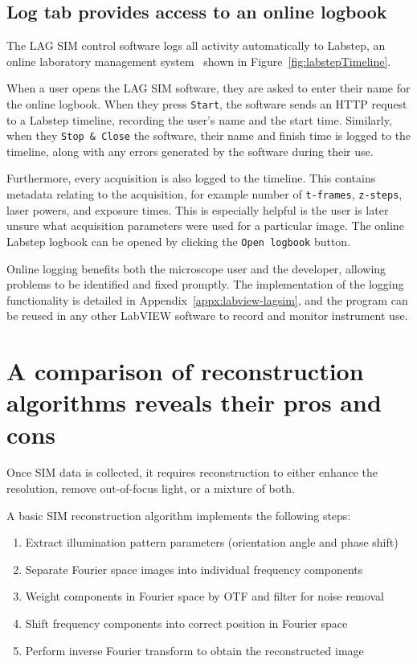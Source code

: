 \subsection{Log tab provides access to an online logbook}
The LAG SIM control software logs all activity automatically to Labstep, an online laboratory management system~\cite{labstep} shown in Figure~\ref{fig:labstepTimeline}.

When a user opens the LAG SIM software, they are asked to enter their name for the online logbook.
When they press \texttt{Start}, the software sends an HTTP request to a Labstep timeline,  recording the user's name and the start time.
Similarly, when they \texttt{Stop \& Close} the software, their name and finish time is logged to the timeline, along with any errors generated by the software during their use.

Furthermore, every acquisition is also logged to the timeline.
This contains metadata relating to the acquisition, for example number of \texttt{t-frames}, \texttt{z-steps}, laser powers, and exposure times.
This is especially helpful is the user is later unsure what acquisition parameters were used for a particular image.
The online Labstep logbook can be opened by clicking the \texttt{Open logbook} button.

Online logging benefits both the microscope user and the developer, allowing problems to be identified and fixed promptly.
The implementation of the logging functionality is detailed in Appendix~\ref{appx:labview-lagsim}, and the program can be reused in any other LabVIEW software to record and monitor instrument use. 

\section{A comparison of reconstruction algorithms reveals their pros and cons} \label{sec:recon}
Once SIM data is collected, it requires reconstruction to either enhance the resolution, remove out-of-focus light, or a mixture of both.

A basic SIM reconstruction algorithm implements the following steps:
\begin{enumerate}
	\item Extract illumination pattern parameters (orientation angle and phase shift)
	\item Separate Fourier space images into individual frequency components
	\item \label{step:filterPreShift}Weight components in Fourier space by OTF and filter for noise removal
	\item \label{step:shiftComponents}Shift frequency components into correct position in Fourier space
	\item Perform inverse Fourier transform to obtain the reconstructed image
\end{enumerate}

